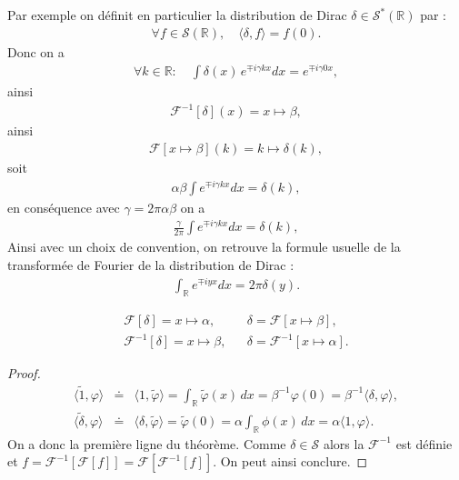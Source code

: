 Par exemple on définit en particulier la distribution de Dirac $\delta\in \mathcal{S}^\ast(\mathbb{R})$ par : 
\begin{eqnarray}
    \forall f \in \mathcal{S}(\mathbb{R}), \quad \langle \delta , f \rangle = f(0).
\end{eqnarray}
Donc on a 
\begin{eqnarray}
    \forall k \in \mathbb{R}\colon \quad \int \delta ( x) \, e^{\mp i \gamma k x } dx  = e^{\mp i \gamma 0 x } , 
\end{eqnarray} 
ainsi 
\begin{eqnarray}
    \mathcal{F}^{-1}[\delta](x) = x \mapsto \beta,
\end{eqnarray} 
ainsi 
\begin{eqnarray}
    \mathcal{F}[x \mapsto \beta](k) = k \mapsto \delta(k),
\end{eqnarray} 
soit 
\begin{eqnarray} 
    \alpha \beta \int e^{\mp i\gamma  k x } dx = \delta(k) ,  
\end{eqnarray} 
en conséquence avec $ \gamma = 2 \pi \alpha \beta $ on a 
\begin{eqnarray}
    \frac{\gamma}{2\pi} \int e^{\mp i \gamma k x } dx = \delta(k),
\end{eqnarray} 
Ainsi avec un choix de convention, on retrouve la formule usuelle de la transformée de Fourier de la distribution de Dirac : 
\begin{eqnarray}
    \int_{\mathbb{R}} e^{\mp i y x } dx = 2 \pi \delta(y).
\end{eqnarray} 

\begin{Theo} 
    \begin{eqnarray}
        \mathcal F[\delta]  =  x \mapsto \alpha, & &  \delta = \mathcal F[x \mapsto \beta ], \\
        \mathcal F^{-1}[\delta]  =  x \mapsto \beta, & & \delta = \mathcal F^{-1}[x \mapsto \alpha ].
    \end{eqnarray}
\end{Theo}
\begin{proof}
    \begin{eqnarray}
        \langle \tilde{\mathrm 1} , \varphi \rangle  & \doteq &  \langle \mathrm 1 , \tilde \varphi \rangle  = \int_{\mathbb R }\tilde \varphi (x) \, dx = \beta^{-1} \varphi(0) = \beta^{-1} \langle \delta , \varphi \rangle ,\\
        \langle \tilde \delta , \varphi \rangle & \doteq &  \langle \delta , \tilde \varphi \rangle = \tilde \varphi(0) = \alpha \int_{\mathbb R } \phi(x) \, dx = \alpha  \langle \mathrm 1 , \varphi \rangle.
    \end{eqnarray}
    On a donc la première ligne du théorème. Comme $\delta \in \mathcal S$ alors la $\mathcal F^{-1}$ est définie et $f = \mathcal F^{-1}[\mathcal F[f]] = \mathcal F[\mathcal F^{-1}[f]]$. On peut ainsi conclure.
\end{proof}

